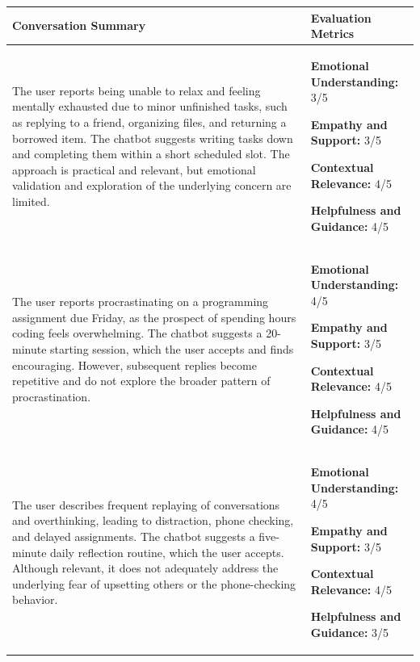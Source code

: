 \documentclass[conference]{IEEEtran}
\begin{document}
\begin{table}[ht]
\centering
\renewcommand{\arraystretch}{1.4}
\small
\begin{tabularx}{\textwidth}{
|>{\raggedright\arraybackslash}X|
>{\raggedright\arraybackslash}p{}|
}
\hline
\textbf{Conversation Summary} & \textbf{Evaluation Metrics} \\
\hline

The user reports being unable to relax and feeling mentally exhausted due to minor unfinished tasks, such as replying to a friend, organizing files, and returning a borrowed item. The chatbot suggests writing tasks down and completing them within a short scheduled slot. The approach is practical and relevant, but emotional validation and exploration of the underlying concern are limited.
&
\textbf{Emotional Understanding:} 3/5 \par
\textbf{Empathy and Support:} 3/5 \par
\textbf{Contextual Relevance:} 4/5 \par
\textbf{Helpfulness and Guidance:} 4/5
\\
\hline

The user reports procrastinating on a programming assignment due Friday, as the prospect of spending hours coding feels overwhelming. The chatbot suggests a 20-minute starting session, which the user accepts and finds encouraging. However, subsequent replies become repetitive and do not explore the broader pattern of procrastination.
&
\textbf{Emotional Understanding:} 4/5 \par
\textbf{Empathy and Support:} 3/5 \par
\textbf{Contextual Relevance:} 4/5 \par
\textbf{Helpfulness and Guidance:} 4/5
\\
\hline

The user describes frequent replaying of conversations and overthinking, leading to distraction, phone checking, and delayed assignments. The chatbot suggests a five-minute daily reflection routine, which the user accepts. Although relevant, it does not adequately address the underlying fear of upsetting others or the phone-checking behavior.
&
\textbf{Emotional Understanding:} 4/5 \par
\textbf{Empathy and Support:} 3/5 \par
\textbf{Contextual Relevance:} 4/5 \par
\textbf{Helpfulness and Guidance:} 3/5
\\
\hline


\end{tabularx}
\end{table}
\end{document}
